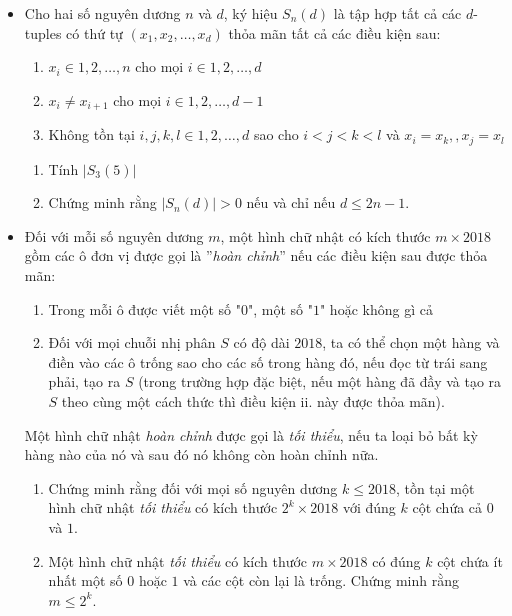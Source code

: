 \documentclass[11pt]{scrartcl}
\begin{document}
\begin{itemize}[label=, leftmargin=0em, itemsep=-0em]
    \item \begin{btvn}
        Cho hai số nguyên dương $n$ và $d$, ký hiệu $S_n(d)$ là tập hợp tất cả các $d$-tuples có thứ tự $(x_1,x_2,\dots ,x_d)$ thỏa mãn tất cả các điều kiện sau:
        \begin{enumerate}
            \item $x_i\in {1,2,\dots ,n}$ cho mọi $i\in{1,2,\dots ,d}$
            \item $x_i\ne x_{i+1}$ cho mọi $i\in{1,2,\dots ,d-1}$
            \item Không tồn tại $i,j,k,l\in{1,2,\dots ,d}$ sao cho $i<j<k<l$ và 
            $x_i=x_k,, x_j=x_l$
        \end{enumerate}
        \begin{enumerate}[label=(\alph*)]
        \item Tính $|S_3(5)|$
        \item Chứng minh rằng $|S_n(d)|>0$ nếu và chỉ nếu $d\leq 2n-1$.
        \end{enumerate}
    \end{btvn}

    \item \begin{btvn}
        Đối với mỗi số nguyên dương $m$, một hình chữ nhật có kích thước $m\times 2018$ gồm các ô đơn vị được gọi là ''\textit{hoàn chỉnh}'' nếu các điều kiện sau được thỏa mãn:
        \begin{enumerate}
            \item Trong mỗi ô được viết một số "$0$", một số "$1$" hoặc không gì cả
            \item Đối với mọi chuỗi nhị phân $S$ có độ dài $2018$, ta có thể chọn một hàng và điền vào các ô trống sao cho các số trong hàng đó, nếu đọc từ trái sang phải, tạo ra $S$ (trong trường hợp đặc biệt, nếu một hàng đã đầy và tạo ra $S$ theo cùng một cách thức thì điều kiện ii. này được thỏa mãn).
        \end{enumerate}
        Một hình chữ nhật \textit{hoàn chỉnh} được gọi là \textit{tối thiểu}, nếu ta loại bỏ bất kỳ hàng nào của nó và sau đó nó không còn hoàn chỉnh nữa.
        \begin{enumerate}[label=(\alph*)]
        \item Chứng minh rằng đối với mọi số nguyên dương $k\le 2018$, tồn tại một hình chữ nhật \textit{tối thiểu} có kích thước $2^k\times 2018$ với đúng $k$ cột chứa cả $0$ và $1$.
        \item Một hình chữ nhật \textit{tối thiểu} có kích thước $m\times 2018$ có đúng $k$ cột chứa ít nhất một số $0$ hoặc $1$ và các cột còn lại là trống. Chứng minh rằng $m\le 2^k$.
        \end{enumerate}
    \end{btvn}


\end{itemize}
\end{document}
